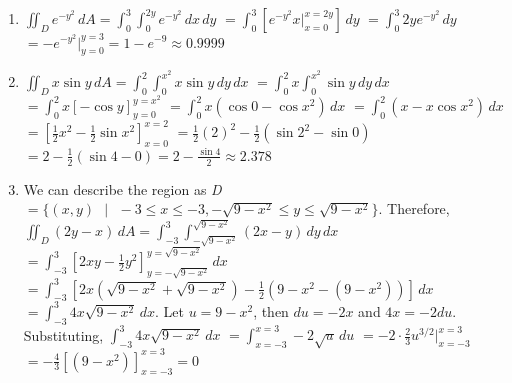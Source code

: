 \begin{Answer}[ref = non-rect]
\begin{enumerate}
    \item $\iint_{\textit{D}} e^{-y^2} \,dA = \int_0^3 \int_{0}^{2y} e^{-y^2}\,
    dx\,dy$ $= \int_0^3 \left[ e^{-y^2} x|_{x = 0}^{x = 2y} \right]\,dy$ $= 
    \int_0^3 2y e^{-y^2}\,dy$ $= -e^{-y^2}|_{y = 0}^{y = 3} = 1 - e^{-9} 
    \approx 0.9999$

    \item $\iint_{\textit{D}} x \sin{y}\,dA = \int_0^{2} \int_0^{x^2} x \sin{y}
    \,dy\,dx$ $= \int_0^{2} x \int_0^{x^2} \sin{y}\,dy\,dx$ $= \int_0^{2} x 
    \left[ -\cos{y} \right]_{y = 0}^{y = x^2}$ $= \int_0^{2} x \left( \cos{0} -
    \cos{x^2} \right)\,dx$ $= \int_0^{2} \left( x - x\cos{x^2} \right)\,dx$ $= 
    \left[ \frac{1}{2}x^2 - \frac{1}{2}\sin{x^2} \right]_{x = 0}^{x = 2}$ $= 
    \frac{1}{2}(2)^2 - \frac{1}{2} \left( \sin{2^2} - \sin{0} \right)$ $= 2 - 
    \frac{1}{2} \left( \sin{4} - 0 \right) = 2 - \frac{\sin{4}}{2} \approx 
    2.378$

    \item We can describe the region as \textit{D} $= \{ (x, y) \text{ } | 
    \text{ } -3 \leq x \leq -3, -\sqrt{9 - x^2} \leq y \leq \sqrt{9 - x^2} \}$.
    Therefore, $\iint_{\textit{D}} \left(2y - x \right)\,dA = \int_{-3}^3 
    \int_{-\sqrt{9 - x^2}}^{\sqrt{9 - x^2}} \left( 2x - y \right)\,dy\,dx$ $= 
    \int_{-3}^3 \left[ 2xy - \frac{1}{2}y^2 \right]_{y = -\sqrt{9 - x^2}}^{y = 
    \sqrt{9 - x^2}}\,dx$ $= \int_{-3}^3 \left[ 2x \left( \sqrt{9 - x^2} + 
    \sqrt{9 - x^2} \right) - \frac{1}{2} \left( 9 - x^2 - \left(9 - x^2 \right) 
    \right) \right]\,dx$ $= \int_{-3}^3 4x\sqrt{9 - x^2}\,dx$. Let $u = 9 - 
    x^2$, then $du = -2x$ and $4x = -2du$. Substituting, $\int_{-3}^3 4x\sqrt{
    9 - x^2}\,dx$ $= \int_{x = -3}^{x = 3} -2\sqrt{u}\,du$ $= -2 \cdot 
    \frac{2}{3} u^{3/2}|_{x = -3}^{x = 3}$ $= -\frac{4}{3} \left[ \left( 9 - 
    x^2 \right) \right]_{x = -3}^{x = 3} = 0$
\end{enumerate}
\end{Answer}


